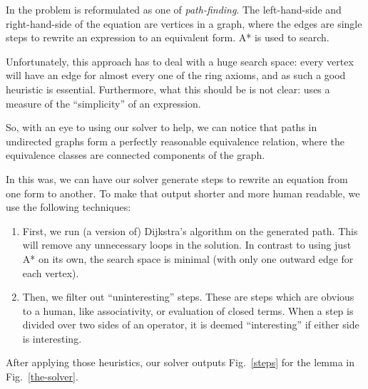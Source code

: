 \documentclass[acmsmall, screen, nonacm, timestamp, review]{acmart}
\theoremstyle{definition}
\theoremstyle{definition}
\begin{document}
In \citet{lioubartsev_constructing_2016} the problem is reformulated as one of
\emph{path-finding}. The left-hand-side and right-hand-side of the equation are
vertices in a graph, where the edges are single steps to rewrite an expression
to an equivalent form. A* is used to search.

Unfortunately, this approach has to deal with a huge search space: every vertex
will have an edge for almost every one of the ring axioms, and as such a good
heuristic is essential. Furthermore, what this should be is not clear:
\citet{lioubartsev_constructing_2016} uses a measure of the ``simplicity'' of an
expression.

So, with an eye to using our solver to help, we can notice that paths in
undirected graphs form a perfectly reasonable equivalence relation, where
the equivalence classes are connected components of the graph.

In this was, we can have our solver generate steps to rewrite an equation from
one form to another. To make that output shorter and more human readable, we use
the following techniques:
\begin{enumerate}
  \item First, we run (a version of) Dijkstra's algorithm on the generated path.
    This will remove any unnecessary loops in the solution. In contrast to using
    just A* on its own, the search space is minimal (with only one outward edge
    for each vertex).
  \item Then, we filter out ``uninteresting'' steps. These are steps which are
    obvious to a human, like associativity, or evaluation of closed terms. When
    a step is divided over two sides of an operator, it is deemed
    ``interesting'' if either side is interesting.
\end{enumerate}

After applying those heuristics, our solver outputs Fig.~\ref{steps} for the lemma
in Fig.~\ref{the-solver}.

\end{document}
